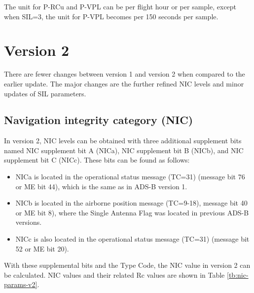 The unit for P-RCu and P-VPL can be per flight hour or per
sample, except when SIL=3, the unit for P-VPL becomes per 150 seconds per sample.



\section{Version 2}

There are fewer changes between version 1 and version 2 when compared to the earlier update. The major changes are the further refined NIC levels and minor updates of SIL parameters.

\subsection{Navigation integrity category (NIC)}

In version 2, NIC levels can be obtained with three additional supplement bits named NIC supplement bit A (NICa), NIC supplement bit B (NICb), and NIC supplement bit C (NICc). These bits can be found as follows:


\begin{itemize}
  \item NICa is located in the operational status message (TC=31) (message bit 76 or ME bit 44), which is the same as in ADS-B version 1.
  \item NICb is located in the airborne position message (TC=9-18), message bit 40 or ME bit 8), where the Single Antenna Flag was located in previous ADS-B versions.
  \item NICc is also located in the operational status message (TC=31) (message bit 52 or ME bit 20).
\end{itemize}

With these supplemental bits and the Type Code, the NIC value in version 2 can be calculated. NIC values and their related Rc values are shown in Table \ref{tb:nic-params-v2}.


